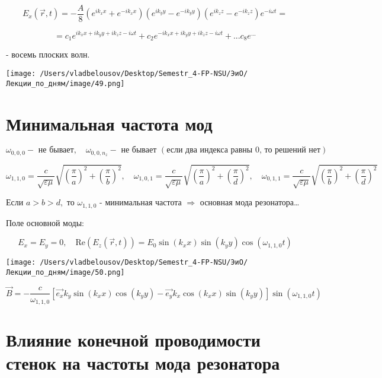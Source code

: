 \documentclass[12pt, a4paper]{report}
\begin{document}
\[ E_x(\vec{r } , t ) = -\frac{A}{8}  (e^{i k_x x} +e^{-i k_x x} )(e^{i k_y y} -e^{-i k_y y} )(e^{i k_z z} -e^{-i k_z z} )e^{- i \omega t} =   \] 

\[ = c_1 e^{i k_x x + i k_y y + i k_z z - i \omega t} +c_2 e^{-i k_x x + i k_y y + i k_z z - i \omega t} +... c_8 e^{...}   \] 

- восемь плоских волн.

\begin{center}
    \texttt{[image: /Users/vladbelousov/Desktop/Semestr\_4-FP-NSU/ЭиО/Лекции\_по\_дням/image/49.png]}
\end{center}

\section{Минимальная частота мод}

\[ \omega_{0,0,0} - \text{ не бывает} ,\quad \omega_{0,0,n_z} - \text{ не бывает } (\text{если два индекса равны 0, то решений нет} )   \] 

\[ \omega_{1,1,0} =\frac{c}{\sqrt{\varepsilon \mu } } \sqrt{\left( \frac{\pi}{a}  \right) ^2 + \left( \frac{\pi}{b}  \right) ^2}  , \quad \omega_{1,0,1} = \frac{c}{\sqrt{\varepsilon \mu } } \sqrt{\left( \frac{\pi}{a}  \right) ^2 + \left( \frac{\pi}{d}  \right) ^2} , \quad \omega_{0,1,1} = \frac{c}{\sqrt{\varepsilon \mu } } \sqrt{\left( \frac{\pi}{b}  \right) ^2 + \left( \frac{\pi}{d}  \right) ^2}  \] 


Если \( a>b>d ,  \) то \( \omega_{1,1,0}  \) - минимальная частота \( \Rightarrow  \) основная мода резонатора\dots

Поле основной моды: 

\[ E_x = E_y = 0  , \quad  \mathrm{Re}  (E_z (\vec{r } , t )) = E_0 \sin (k_x x)\sin  (k_y y)\cos (\omega_{1,1,0} t) \]

\begin{center}
    \texttt{[image: /Users/vladbelousov/Desktop/Semestr\_4-FP-NSU/ЭиО/Лекции\_по\_дням/image/50.png]}
\end{center}

\[ \vec{B }  = - \frac{c}{\omega_{1,1,0} }  \left[ \vec{e_x} k_y \sin (k_x x ) \cos (k_y y ) - \vec{e_y } k_x \cos (k_x x ) \sin (k_y y )   \right]  \sin (\omega_{1,1,0} t)\] 

\section{Влияние конечной проводимости стенок на частоты мода резонатора}
\end{document}
